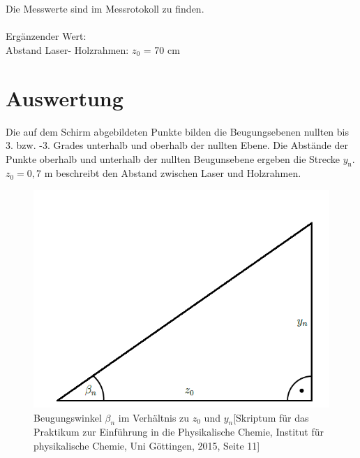 \documentclass[12pt,a4paper,titlepage,headinclude,bibtotoc]{scrartcl}
\begin{document}


Die Messwerte sind im Messrotokoll zu finden.\\\\
Ergänzender Wert:\\
Abstand Laser- Holzrahmen: $z_0$ = 70 cm


\newpage
\section{Auswertung}

Die auf dem Schirm abgebildeten Punkte bilden die Beugungsebenen nullten bis 3. bzw. -3. Grades unterhalb und oberhalb der nullten Ebene. Die Abstände der Punkte oberhalb und unterhalb der nullten Beugunsebene ergeben die Strecke $y_\mathrm {n}$. $z_0= 0,7 $ m beschreibt den Abstand zwischen Laser und Holzrahmen. 

\begin{figure} [h]
\begin{center}
\includegraphics[scale=0.4]{Dreieck.png} \end{center}
\caption{Beugungswinkel $\beta_n$ im Verhältnis zu $z_0$ und $y_n$[Skriptum für das Praktikum zur Einführung in die Physikalische Chemie, Institut für physikalische Chemie, Uni Göttingen, 2015, Seite 11]}
\end{figure}
\end{document}
